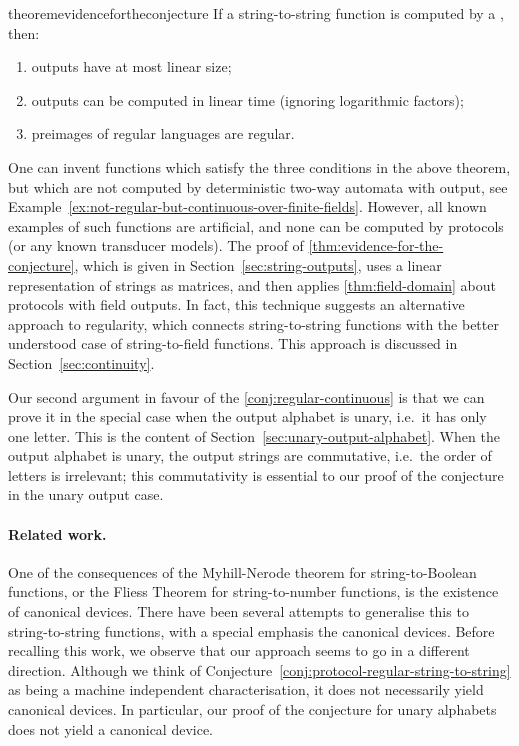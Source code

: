 \begin{restatable}{theorem}{evidencefortheconjecture}
    \label{thm:evidence-for-the-conjecture}
    If a string-to-string function  is  computed by a , then:
    \begin{enumerate}
        \item \label{it:linear-size-outputs} outputs have at most linear size;
        \item \label{it:linear-time-computable} outputs can be   computed in linear time (ignoring logarithmic factors);
        \item \label{it:regular-preimages} preimages of regular languages are regular.
    \end{enumerate}
\end{restatable}

One can invent functions which satisfy the three conditions in the above
theorem, but which are not computed by deterministic two-way automata with output, see
Example~\ref{ex:not-regular-but-continuous-over-finite-fields}. However, all
known examples of such functions  are artificial, and none can be computed by
protocols (or any known transducer models).  The proof of
\cref{thm:evidence-for-the-conjecture}, which is given in
Section~\ref{sec:string-outputs}, uses a linear representation of strings as
matrices, and then applies \cref{thm:field-domain} about protocols with field
outputs. In fact, this technique suggests an alternative approach to regularity,
which connects string-to-string functions with the better understood case of
string-to-field functions. This approach is discussed in
Section~\ref{sec:continuity}.

Our second argument in favour of the \cref{conj:regular-continuous} is that we
can prove it in the special case when the output alphabet is unary, i.e.~it has
only one letter. This is the content of
Section~\ref{sec:unary-output-alphabet}. When the output alphabet is unary, the
output strings are commutative, i.e.~the order of letters is irrelevant; this commutativity is essential to our proof of the conjecture in the unary output case. 



\paragraph*{Related work.} One of the consequences of the Myhill-Nerode theorem
for string-to-Boolean functions, or the Fliess Theorem for string-to-number
functions, is the existence of  canonical devices. There have been several
attempts to generalise this to string-to-string functions, with a special
emphasis the canonical devices. Before recalling this work, we observe that our
approach seems to go in a  different direction. Although we think of
Conjecture~\ref{conj:protocol-regular-string-to-string} as being a machine
independent characterisation, it does not necessarily  yield canonical devices.
In particular, our proof of the conjecture for unary alphabets does not yield a
canonical device.

